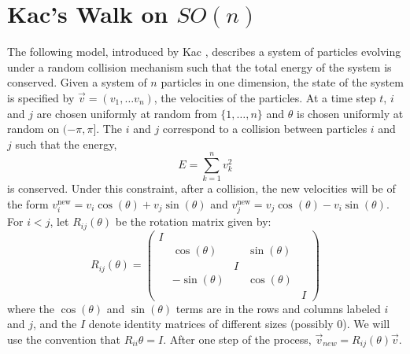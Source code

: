 \documentclass[12pt]{report}
\theoremstyle{definition}
\begin{document}
\section{Kac's Walk on $SO(n)$}
The following model, introduced by Kac \cite{Kac}, describes a system of particles evolving under a random collision mechanism such that the total energy of the system is conserved.  Given a system of $n$ particles in one dimension, the state of the system is specified by $\vec{v}=(v_1,\dots v_n)$, the velocities of the particles.  At a time step $t$, $i$ and $j$ are chosen uniformly at random from $\{1,\dots, n\}$ and $\theta$ is chosen uniformly at random on $(-\pi, \pi]$.  The $i$ and $j$ correspond to a collision between particles $i$ and $j$ such that the energy,
$$
E=\sum_{k=1}^n v_k^2
$$
is conserved.  Under this constraint, after a collision, the new velocities will be of the form $v_i^{\mathrm{new}}=v_i\cos(\theta)+v_j\sin(\theta)$ and $v_j^{\mathrm{new}}=v_j\cos(\theta)-v_i\sin(\theta)$.    
For $i<j$, let $R_{ij}(\theta)$ be the rotation matrix given by:
\begin{equation*}
	R_{ij} (\theta) = \begin{pmatrix} I & & & & \\
		&\cos(\theta) &&\sin(\theta)& \\
		&&I&& \\
		&-\sin(\theta) &&\cos(\theta)& \\
		&&&& I \end{pmatrix}
\end{equation*}
where the $\cos(\theta)$ and $\sin(\theta)$ terms are in the rows and columns labeled $i$ and $j$, and the $I$ denote identity matrices of different sizes (possibly 0). We will use the convention that $R_{ii}{\theta}=I$.  After one step of the process, $\vec{v}_{new}=R_{ij}(\theta)\vec{v}$.  
\end{document}
